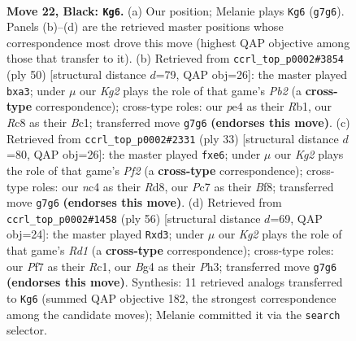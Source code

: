 \documentclass[11pt]{article}
\begin{document}
\clearpage

\begin{figure}[p]\centering
\begin{subfigure}{0.46\textwidth}\centering
\resizebox{\linewidth}{!}{%
\newchessgame
\chessboard[
  setfen={r1r5/1ppnbpkP/p7/P3P1p1/2N1P1b1/1PN5/8/R3KB1R b KQ - 0 22},
  showmover=false,
  pgfstyle=straightmove, color=movearrow, markmove={g7-g6}
]}
\caption{}
\end{subfigure}\hfill
\begin{subfigure}{0.46\textwidth}\centering
\resizebox{\linewidth}{!}{%
\newchessgame
\chessboard[
  setfen={r1b2kn1/2bp2p1/8/2N1P1P1/1p5p/p6P/1Pn1BPK1/1RB4R w - - 0 26},
  showmover=false,
  pgfstyle=straightmove, color=movearrow, markmove={b2-a3}
]}
\caption{}
\end{subfigure}
\\[4pt]
\begin{subfigure}{0.46\textwidth}\centering
\resizebox{\linewidth}{!}{%
\newchessgame
\chessboard[
  setfen={3rkb1r/pp3pp1/2n1P3/2P3Pp/5N2/2N1B3/PPb4P/4KB1R b Kk - 0 17},
  showmover=false,
  pgfstyle=straightmove, color=movearrow, markmove={f7-e6}
]}
\caption{}
\end{subfigure}\hfill
\begin{subfigure}{0.46\textwidth}\centering
\resizebox{\linewidth}{!}{%
\newchessgame
\chessboard[
  setfen={r2b1r1k/6p1/1n2pp1p/1P6/p2PP1N1/3p2BP/5PP1/2RR2K1 w - - 0 29},
  showmover=false,
  pgfstyle=straightmove, color=movearrow, markmove={d1-d3}
]}
\caption{}
\end{subfigure}
\caption{\textbf{Move 22, Black: \texttt{Kg6}.} (a) Our position; Melanie plays \texttt{Kg6} (\texttt{g7g6}). Panels (b)--(d) are the retrieved master positions whose correspondence most drove this move (highest QAP objective among those that transfer to it). (b) Retrieved from \texttt{ccrl\_top\_p0002\#3854} (ply 50) [structural distance $d$=79, QAP obj=26]: the master played \texttt{bxa3}; under $\mu$ our \emph{Kg2} plays the role of that game's \emph{Pb2} (a \textbf{cross-type} correspondence); cross-type roles: our \emph{p}e4 as their \emph{R}b1, our \emph{R}c8 as their \emph{B}c1; transferred move \texttt{g7g6} \textbf{(endorses this move)}. (c) Retrieved from \texttt{ccrl\_top\_p0002\#2331} (ply 33) [structural distance $d$=80, QAP obj=26]: the master played \texttt{fxe6}; under $\mu$ our \emph{Kg2} plays the role of that game's \emph{Pf2} (a \textbf{cross-type} correspondence); cross-type roles: our \emph{n}c4 as their \emph{R}d8, our \emph{P}c7 as their \emph{B}f8; transferred move \texttt{g7g6} \textbf{(endorses this move)}. (d) Retrieved from \texttt{ccrl\_top\_p0002\#1458} (ply 56) [structural distance $d$=69, QAP obj=24]: the master played \texttt{Rxd3}; under $\mu$ our \emph{Kg2} plays the role of that game's \emph{Rd1} (a \textbf{cross-type} correspondence); cross-type roles: our \emph{P}f7 as their \emph{R}c1, our \emph{B}g4 as their \emph{P}h3; transferred move \texttt{g7g6} \textbf{(endorses this move)}. Synthesis: 11 retrieved analogs transferred to \texttt{Kg6} (summed QAP objective 182, the strongest correspondence among the candidate moves); Melanie committed it via the \texttt{search} selector.}
\label{fig:thought-m43}
\end{figure}
\end{document}
